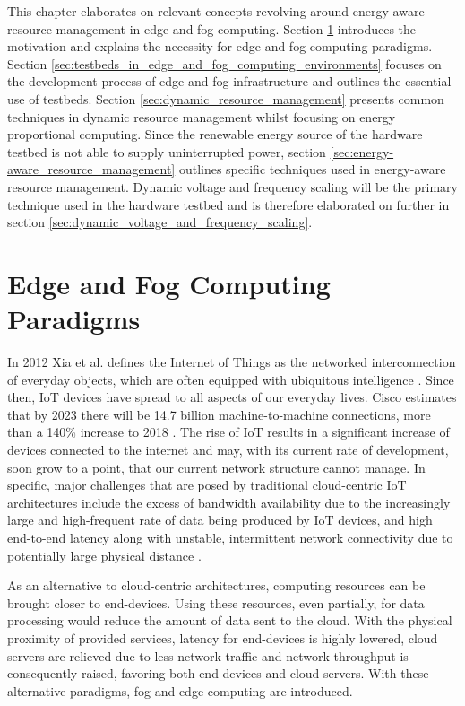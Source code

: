 This chapter elaborates on relevant concepts revolving around energy-aware
resource management in edge and fog computing. Section
\ref{sec:edge_and_fog_computing_paradigms} introduces the motivation and
explains the necessity for edge and fog computing paradigms. Section
\ref{sec:testbeds_in_edge_and_fog_computing_environments} focuses on the
development process of edge and fog infrastructure and outlines the essential
use of testbeds. Section \ref{sec:dynamic_resource_management} presents common
techniques in dynamic resource management whilst focusing on energy proportional
computing. Since the renewable energy source of the hardware testbed is not able
to supply uninterrupted power, section
\ref{sec:energy-aware_resource_management} outlines specific techniques used in
energy-aware resource management. Dynamic voltage and frequency scaling will be
the primary technique used in the hardware testbed and is therefore elaborated
on further in section \ref{sec:dynamic_voltage_and_frequency_scaling}.

\section{Edge and Fog Computing Paradigms}
\label{sec:edge_and_fog_computing_paradigms}

In 2012 Xia et al. defines the Internet of Things as the networked
interconnection of everyday objects, which are often equipped with ubiquitous
intelligence \cite{xia2012}. Since then, IoT devices have spread to all aspects
of our everyday lives. Cisco estimates that by 2023 there will be 14.7 billion
machine-to-machine connections, more than a 140\% increase to 2018
\cite{cisco2020}. The rise of IoT results in a significant increase of devices
connected to the internet and may, with its current rate of development, soon
grow to a point, that our current network structure cannot manage. In specific,
major challenges that are posed by traditional cloud-centric IoT architectures
include the excess of bandwidth availability due to the increasingly large and
high-frequent rate of data being produced by IoT devices, and high end-to-end
latency along with unstable, intermittent network connectivity due to
potentially large physical distance \cite{buyya2019}.

As an alternative to cloud-centric architectures, computing resources can be
brought closer to end-devices. Using these resources, even partially, for data
processing would reduce the amount of data sent to the cloud. With the physical
proximity of provided services, latency for end-devices is highly lowered, cloud
servers are relieved due to less network traffic and network throughput is
consequently raised, favoring both end-devices and cloud servers. With these
alternative paradigms, fog and edge computing are introduced.

